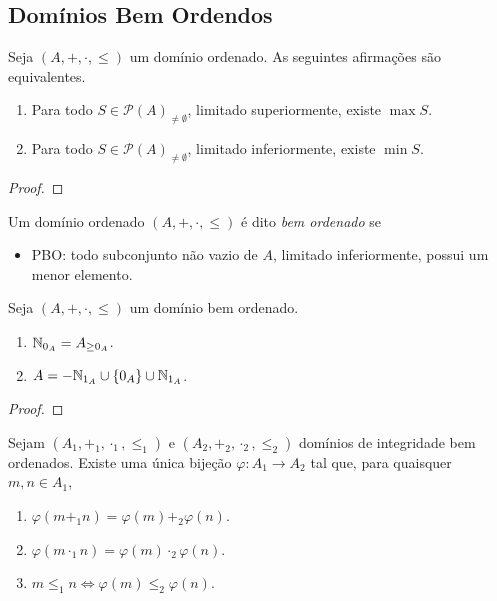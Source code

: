 \subsection{Domínios Bem Ordendos}

\begin{proposition}
    Seja $(A, +, \cdot, \leq)$ um domínio ordenado. As seguintes afirmações são equivalentes.
        \begin{enumerate}[label=\roman*.]
            \item Para todo $S \in \mathcal{P}(A)_{\neq \emptyset}$, limitado superiormente, existe $\max S$.
            \item Para todo $S \in \mathcal{P}(A)_{\neq \emptyset}$, limitado inferiormente, existe $\min S$.
        \end{enumerate} 
\end{proposition}

\begin{proof}
    \blackproof
\end{proof}

\begin{definition}
    Um domínio ordenado $(A, +, \cdot, \leq)$ é dito \emph{bem ordenado} se
        \begin{itemize}
            \item PBO: todo subconjunto não vazio de $A$, limitado inferiormente, possui um menor elemento.
        \end{itemize}
\end{definition}

\begin{theorem}
    Seja $(A, +, \cdot, \leq)$ um domínio bem ordenado.
        \begin{enumerate}[leftmargin=*, align=left, label=\textbf{(\alph*)}]
            \item $\mathbb{N}_{0_{A}} = A_{\geq 0_{A}}$.
            \item $A = -\mathbb{N}_{1_{A}} \cup \{0_{A}\} \cup \mathbb{N}_{1_{A}}$.
        \end{enumerate} 
\end{theorem}

\begin{proof}
    \blackproof
\end{proof}

\begin{theorem}
    Sejam $(A_1, +_1, \cdot_1, \leq_1)$ e $(A_2, +_2, \cdot_2, \leq_2)$ domínios de integridade bem ordenados. Existe uma única bijeção $\varphi : A_1 \to A_2$ tal que, para quaisquer $m,n \in A_1$,
        \begin{enumerate}[label=\roman*.]
            \item $\varphi (m +_1 n) = \varphi(m) +_2 \varphi(n)$.
            \item $\varphi (m \cdot_1 n) = \varphi(m) \cdot_2 \varphi(n)$.
            \item $m \leq_1 n \Leftrightarrow \varphi(m) \leq_2 \varphi(n)$.
        \end{enumerate}
\end{theorem}

